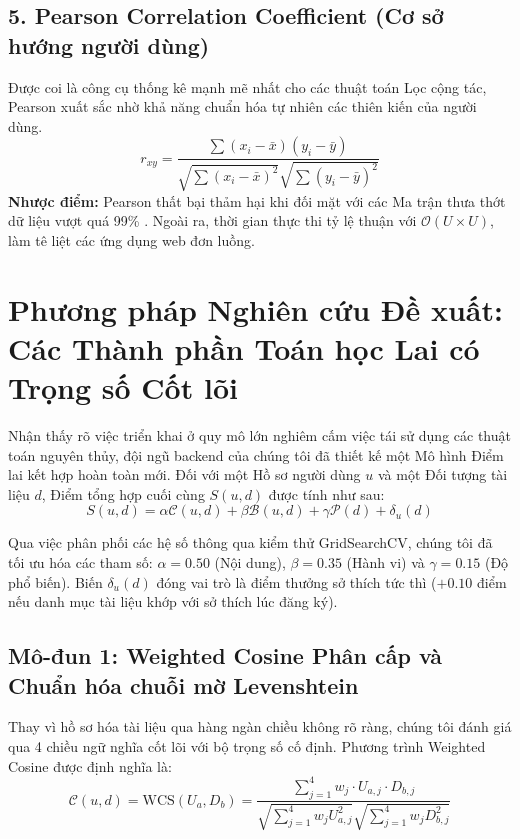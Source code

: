 \documentclass[journal]{IEEEtran}
\begin{document}
\subsection{5. Pearson Correlation Coefficient (Cơ sở hướng người dùng)}

Được coi là công cụ thống kê mạnh mẽ nhất cho các thuật toán Lọc cộng tác, Pearson xuất sắc nhờ khả năng chuẩn hóa tự nhiên các thiên kiến của người dùng.
\begin{equation}
\label{eq:pearson_baseline}
r_{xy} = \frac{\sum (x_i - \bar{x})(y_i - \bar{y})}{\sqrt{\sum (x_i - \bar{x})^2} \sqrt{\sum (y_i - \bar{y})^2}}
\end{equation}
\textbf{Nhược điểm:} Pearson thất bại thảm hại khi đối mặt với các Ma trận thưa thớt dữ liệu vượt quá 99\% \cite{matrixfactorization2009}. Ngoài ra, thời gian thực thi tỷ lệ thuận với $\mathcal{O}(U \times U)$, làm tê liệt các ứng dụng web đơn luồng.

\section{Phương pháp Nghiên cứu Đề xuất:\\ Các Thành phần Toán học Lai có Trọng số Cốt lõi}
\label{sec:proposed}

Nhận thấy rõ việc triển khai ở quy mô lớn nghiêm cấm việc tái sử dụng các thuật toán nguyên thủy, 
đội ngũ backend của chúng tôi đã thiết kế một Mô hình Điểm lai kết hợp hoàn toàn mới. 
Đối với một Hồ sơ người dùng $u$ và một Đối tượng tài liệu $d$, 
Điểm tổng hợp cuối cùng $S(u, d)$ được tính như sau:
\begin{equation}
\label{eq:hybrid_formula}
S(u, d) = \alpha \mathcal{C}(u,d) + \beta \mathcal{B}(u,d) + \gamma \mathcal{P}(d) + \delta_u(d)
\end{equation}

Qua việc phân phối các hệ số thông qua kiểm thử GridSearchCV, 
chúng tôi đã tối ưu hóa các tham số: 
$\alpha = 0.50$ (Nội dung), 
$\beta = 0.35$ (Hành vi) và 
$\gamma = 0.15$ (Độ phổ biến). 
Biến $\delta_u(d)$ đóng vai trò là điểm thưởng sở thích tức thì ($+0.10$ điểm nếu danh mục tài liệu khớp với sở thích lúc đăng ký).

\subsection{Mô-đun 1: Weighted Cosine Phân cấp và Chuẩn hóa chuỗi mờ Levenshtein}

Thay vì hồ sơ hóa tài liệu qua hàng ngàn chiều không rõ ràng, 
chúng tôi đánh giá qua 4 chiều ngữ nghĩa cốt lõi với bộ trọng số cố định. 
Phương trình Weighted Cosine được định nghĩa là:
\begin{equation}
\label{eq:wcs_engine}
\mathcal{C}(u,d) = \text{WCS}(U_a, D_b) = \frac{\sum_{j=1}^{4} w_j \cdot U_{a,j} \cdot D_{b,j}}{\sqrt{\sum_{j=1}^{4} w_j U_{a,j}^2} \sqrt{\sum_{j=1}^{4} w_j D_{b,j}^2}}
\end{equation}
\end{document}

